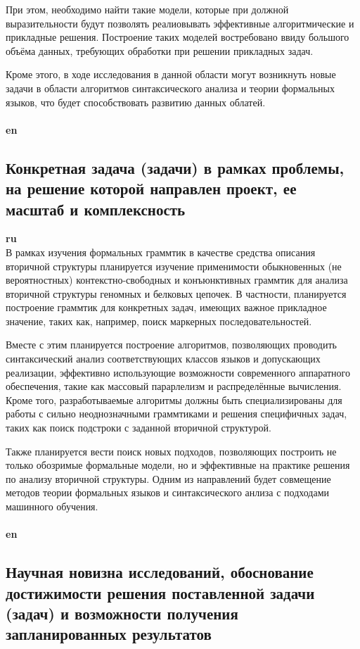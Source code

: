\documentclass[12pt]{article}  %
\theoremstyle{remark}
\begin{document}
При этом, необходимо найти такие модели, которые при должной выразительности будут позволять реалиовывать эффективные алгоритмические и прикладные решения.
Построение таких моделей востребовано ввиду большого объёма данных, требующих обработки при решении прикладных задач.

Кроме этого, в ходе исследования в данной области могут возникнуть новые задачи в области алгоритмов синтаксического анализа и теории формальных языков, что будет способствовать развитию данных облатей.
\\
\\
\textbf{en}\\



\subsection{Конкретная задача (задачи) в рамках проблемы, на решение которой направлен проект, ее масштаб и комплексность}

\textbf{ru}\\
В рамках изучения формальных граммтик в качестве средства описания вторичной структуры планируется изучение применимости обыкновенных (не вероятностных) контекстно-свободных и конъюнктивных граммтик для анализа вторичной структуры геномных и белковых цепочек.
В частности, планируется построение граммтик для конкретных задач, имеющих важное прикладное значение, таких как, например, поиск маркерных последовательностей.

Вместе с этим планируется построение алгоритмов, позволяющих проводить синтаксический анализ соответствующих классов языков и допускающих реализации, эффективно использующие возможности современного аппаратного обеспечения, такие как массовый парарлелизм и распределённые вычисления.
Кроме того, разработываемые алгоритмы должны быть специализированы для работы с сильно неоднозначными граммтиками и решения специфичных задач, таких как поиск подстроки с заданной вторичной структурой.

Также планируется вести поиск новых подходов, позволяющих построить не только обозримые формальные модели, но и эффективные на практике решения по анализу вторичной структуры.
Одним из направлений будет совмещение методов теории формальных языков и синтаксического анлиза с подходами машинного обучения.
\\
\\
\textbf{en}\\


\subsection{Научная новизна исследований, обоснование достижимости решения поставленной задачи (задач) и возможности получения запланированных результатов}
\end{document}

